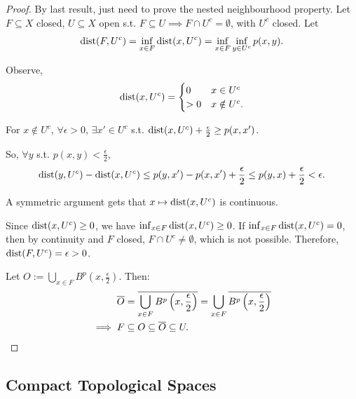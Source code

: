 \begin{proof}
    By last result, just need to prove the nested neighbourhood property. Let $F \subseteq X$ closed, 
    $U \subseteq X$ open s.t. $F \subseteq U \implies F \cap U^c = \emptyset$, with $U^c$ closed.
    Let 
    \[
        \operatorname{dist}(F, U^c) = \inf_{x \in F} \operatorname{dist}(x, U^c) = \inf_{x \in F} \inf_{y \in U^c} p(x, y).
    \]
    
    \noindent Observe, 
    \[
        \operatorname{dist}(x, U^c) = \begin{cases}
            0 & x \in U^c \\
            > 0 & x \notin U^c.
        \end{cases}
    \] 

    \noindent For $x \notin U^c$, $\forall \epsilon > 0$, $\exists x' \in U^c$ s.t. $\operatorname{dist}(x, U^c) + 
    \frac{\epsilon}{2} \geq p(x, x')$. 
    
    So, $\forall y$ s.t. $p(x, y) < \frac{\epsilon}{2}$, 
    \[
        \operatorname{dist}(y, U^c) - \operatorname{dist}(x, U^c) \leq p(y, x') - p(x, x') + \frac{\epsilon}{2} \leq p(y, x) + 
        \frac{\epsilon}{2} < \epsilon.
    \]  
    
    A symmetric argument gets that $x \mapsto \operatorname{dist}(x, U^c)$ is continuous. 

    \noindent Since $\operatorname{dist}(x, U^c) \geq 0$, we have $\inf_{x \in F} \operatorname{dist}(x, U^c) \geq 0$.
    If $\inf_{x \in F} \operatorname{dist}(x, U^c) = 0$, then by continuity and $F$ closed, $F \cap U^c \neq \emptyset$, 
    which is not possible. Therefore, $\operatorname{dist}(F, U^c) = \epsilon > 0$. 
    
    Let $O := \bigcup_{x \in F} B^p\left(x, \frac{\epsilon}{2}\right)$. Then:
    \begin{align*}
        \overline{O} &= \overline{\bigcup_{x \in F} B^p\left(x, \frac{\epsilon}{2}\right)} 
                     = \bigcup_{x \in F} \overline{B^p\left(x, \frac{\epsilon}{2}\right)} \\
        \implies F &\subseteq O \subseteq \overline{O} \subseteq U. \qedhere
    \end{align*}
\end{proof}

 \subsection{Compact Topological Spaces}

